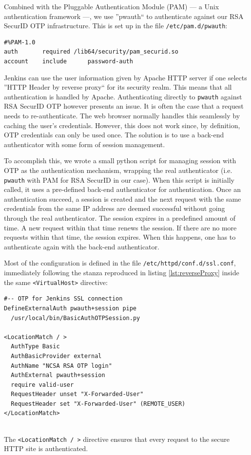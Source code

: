 \documentclass[AMA]{WileyNJD-v1}
\begin{document}
Combined with the Pluggable Authentication Module (PAM) --- a Unix authentication framework ---, we use ''pwauth`` to authenticate against our RSA SecurID OTP infrastructure. 
This is set up in the file \texttt{/etc/pam.d/pwauth}:
\begin{lstlisting}
#%PAM-1.0
auth	   required	/lib64/security/pam_securid.so
account    include      password-auth
\end{lstlisting}

Jenkins can use the user information given by Apache HTTP server if one selects ''HTTP Header by reverse proxy`` for its security realm. 
This means that all authentication is handled by Apache. 
Authenticating directly to \texttt{pwauth} against RSA SecurID OTP however presents an issue. 
It is often the case that a request needs to re-authenticate. 
The web browser normally handles this seamlessly by caching the user's credentials.
However, this does not work since, by definition, OTP credentials can only be used once. 
The solution is to use a back-end authenticator with some form of session management. 

To accomplish this, we wrote a small python script for managing session with OTP \cite{BasicAuthOTPSession} as the authentication mechanism, wrapping the real authenticator (i.e. \texttt{pwauth} with PAM for RSA SecurID in our case). 
When this script is initially called, it uses a pre-defined back-end authenticator for authentication. 
Once an authentication succeed, a session is created and the next request with the same credentials from the same IP address are deemed successful without going through the real authenticator. 
The session expires in a predefined amount of time. 
A new request within that time renews the session. 
If there are no more requests within that time, the session expires.
When this happens, one has to authenticate again with the back-end authenticator. 

Most of the configuration is defined in the file \texttt{/etc/httpd/conf.d/ssl.conf}, immediately following the stanza reproduced in listing \ref{lst:reverseProxy} inside the same \texttt{<VirtualHost>} directive:

\begin{lstlisting}
#-- OTP for Jenkins SSL connection
DefineExternalAuth pwauth+session pipe 
  /usr/local/bin/BasicAuthOTPSession.py

<LocationMatch / > 
  AuthType Basic
  AuthBasicProvider external
  AuthName "NCSA RSA OTP login" 
  AuthExternal pwauth+session
  require valid-user  
  RequestHeader unset "X-Forwarded-User"
  RequestHeader set "X-Forwarded-User" (REMOTE_USER)
</LocationMatch>
 
\end{lstlisting}
The \texttt{<LocationMatch / >} directive ensures that every request to the secure HTTP site is authenticated. 
\end{document}
